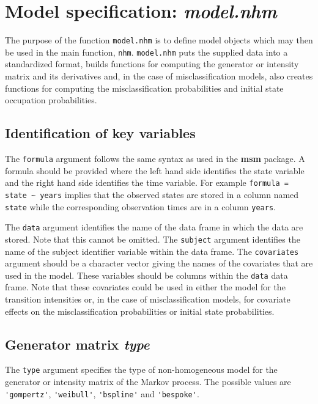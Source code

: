 \documentclass{article}
\numberwithin{equation}{section}
\begin{document}
\section{Model specification: {\it model.nhm}}
\label{model_spec}

The purpose of the function \verb!model.nhm! is to define model objects which may then be used in the main function, \verb!nhm!. \verb!model.nhm! puts the supplied data into a standardized format, builds functions for computing the generator or intensity matrix and its derivatives and, in the case of misclassification models, also creates functions for computing the misclassification probabilities and initial state occupation probabilities.

\subsection{Identification of key variables}

The \verb!formula! argument follows the same syntax as used in the {\bf msm} package. A formula should be provided where the left hand side identifies the state variable and the right hand side identifies the time variable. For example \verb!formula = state ~ years! implies that the observed states are stored in a column named \verb!state! while the corresponding observation times are in a column \verb!years!.

The \verb!data! argument identifies the name of the data frame in which the data are stored. Note that this cannot be omitted. The \verb!subject! argument identifies the name of the subject identifier variable within the data frame. The \verb!covariates! argument should be a character vector giving the names of the covariates that are used in the model. These variables should be columns within the \verb!data! data frame. Note that these covariates could be used in either the model for the transition intensities or, in the case of misclassification models, for covariate effects on the misclassification probabilities or initial state probabilities.

\subsection{Generator matrix {\it type}}

The \verb!type! argument specifies the type of non-homogeneous model for the generator or intensity matrix of the Markov process. The possible values are \verb!'gompertz'!, \verb!'weibull'!, \verb!'bspline'! and \verb!'bespoke'!.
\end{document}
